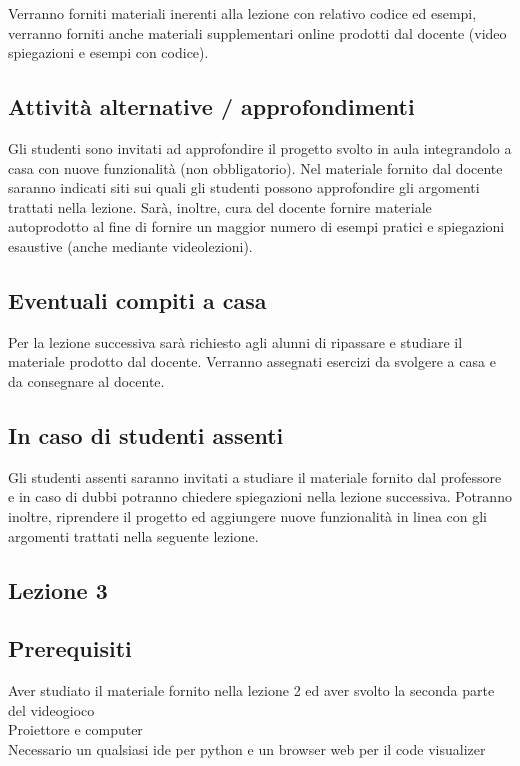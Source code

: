 \documentclass[12pt,a4paper]{article}
\begin{document}
Verranno forniti materiali inerenti alla lezione con relativo codice ed esempi, verranno forniti anche materiali supplementari online prodotti dal docente (video spiegazioni e esempi con codice).


\subsection*{Attività alternative / approfondimenti}
Gli studenti sono invitati ad approfondire il progetto svolto in aula integrandolo a casa con nuove funzionalità (non obbligatorio). Nel materiale fornito dal docente saranno indicati siti sui quali gli studenti possono approfondire gli argomenti trattati nella lezione.  Sarà, inoltre, cura del docente fornire materiale autoprodotto al fine di fornire un maggior numero di esempi pratici e spiegazioni esaustive (anche mediante videolezioni).

\subsection*{Eventuali compiti a casa}
Per la lezione successiva sarà richiesto agli alunni di ripassare e studiare il materiale prodotto dal docente. Verranno assegnati esercizi da svolgere a casa e da consegnare al docente. 


\subsection*{In caso di studenti assenti}
Gli studenti assenti saranno invitati a studiare il materiale fornito dal professore e in caso di dubbi potranno chiedere spiegazioni nella lezione successiva. Potranno inoltre, riprendere il progetto ed aggiungere nuove funzionalità in linea con gli argomenti trattati nella seguente lezione.












\subsection{Lezione 3} 

\subsection*{Prerequisiti}
Aver studiato il materiale fornito nella lezione 2 ed aver svolto la seconda parte del videogioco\\
Proiettore e computer\\
Necessario un qualsiasi ide per python e un browser web per il code visualizer
\end{document}
